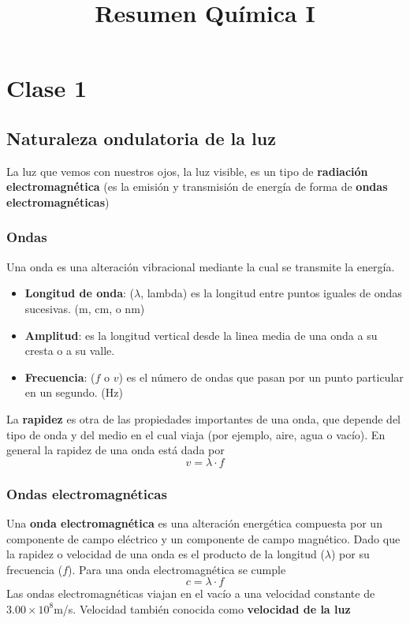 \documentclass{article}
\title{Resumen Química I}
\author{}
\date{}
\begin{document}
\maketitle


\section{Clase 1}


\subsection{Naturaleza ondulatoria de la luz}
La luz que vemos con nuestros ojos, la luz visible, es un tipo de \textbf{radiación electromagnética} (es la emisión y transmisión de energía de forma de \textbf{ondas electromagnéticas})

\subsubsection{Ondas}
Una onda es una alteración vibracional mediante la cual se transmite la energía.
\begin{itemize}
    \item \textbf{Longitud de onda}: ($\lambda$, lambda) es la longitud entre puntos iguales de ondas sucesivas. (m, cm, o nm)
    \item \textbf{Amplitud}: es la longitud vertical desde la linea media de una onda a su cresta o a su valle.
    \item \textbf{Frecuencia}: ($f$ o $v$) es el número de ondas que pasan por un punto particular en un segundo. (Hz)
\end{itemize}
La \textbf{rapidez} es otra de las propiedades importantes de una onda, que depende del tipo de onda y del medio en el cual viaja (por ejemplo, aire, agua o vacío). En general la rapidez de una onda está dada por
\begin{equation}
    v=\lambda \cdot f
\end{equation}

\subsubsection{Ondas electromagnéticas}
Una \textbf{onda electromagnética} es una alteración energética compuesta por un componente de campo eléctrico y un componente de campo magnético. Dado que la rapidez o velocidad de una onda es el producto de la longitud ($\lambda$) por su frecuencia ($f$). Para una onda electromagnética se cumple
\begin{equation} \label{clambdaf}
    c=\lambda \cdot f
\end{equation}
Las ondas electromagnéticas viajan en el vacío a una velocidad constante de $3.00\times 10^8 $m/s. Velocidad también conocida como \textbf{velocidad de la luz}
\end{document}
